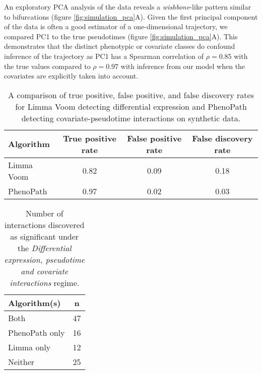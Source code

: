 An exploratory PCA analysis of the data reveals a \emph{wishbone}-like pattern similar to bifurcations (figure \ref{fig:simulation_pca}A). Given the first principal component of the data is often a good estimator of a one-dimensional trajectory, we compared PC1 to the true pseudotimes (figure \ref{fig:simulation_pca}A). This demonstrates that the distinct phenotypic or covariate classes do confound inference of the trajectory as PC1 has a Spearman correlation of $\rho = 0.85$ with the true values compared to $\rho = 0.97$ with inference from our model when the covariates are explicitly taken into account.


\begin{table}[!t]
\begin{center}
    \begin{tabular}{ | l | c  c  c |}
    \hline
    Algorithm & True positive rate & False positive rate & False discovery rate \\ \hline
    Limma Voom & 0.82 & 0.09 & 0.18 \\
    PhenoPath & 0.97 & 0.02 & 0.03 \\
    \hline
  \end{tabular}
\end{center} \caption{A comparison of true positive, false positive, and false discovery rates for Limma Voom detecting differential expression and PhenoPath detecting covariate-pseudotime interactions on synthetic data.} \label{tbl:fdr}
\end{table}

\begin{table}[ht]
\centering
\begin{tabular}{|l | c|}
  \hline
  Algorithm(s) & n \\
  \hline
 Both &  47 \\
   PhenoPath only &  16 \\
   Limma only &  12 \\
   Neither &  25 \\
   \hline
\end{tabular} \caption{Number of interactions discovered as significant under the \emph{Differential expression, pseudotime and covariate interactions} regime.} \label{tbl:nclvm}
\end{table}

